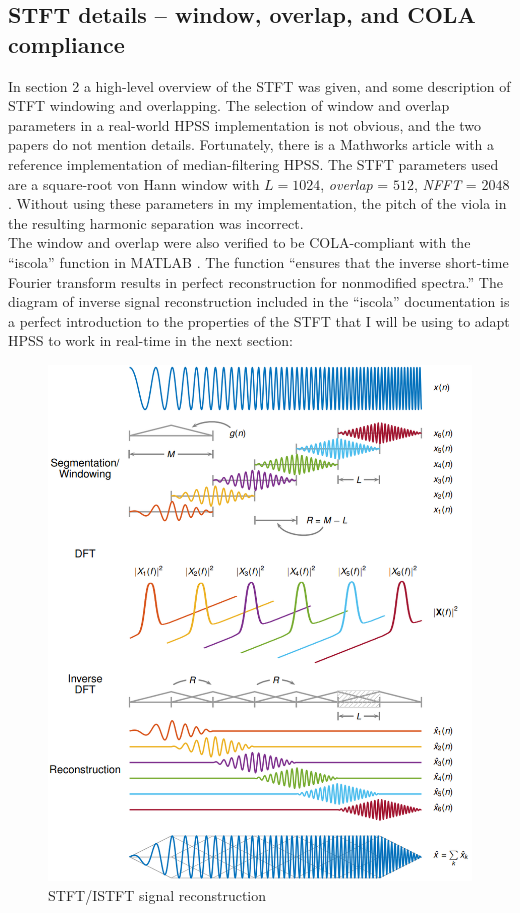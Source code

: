 \documentclass[letter,12pt]{article}
\begin{document}
\vfill
\clearpage %

\subsection{STFT details -- window, overlap, and COLA compliance}

In section 2 a high-level overview of the STFT was given, and some description of STFT windowing and overlapping. The selection of window and overlap parameters in a real-world HPSS implementation is not obvious, and the two papers do not mention details. Fortunately, there is a Mathworks article \cite{god} with a reference implementation of median-filtering HPSS. The STFT parameters used are a square-root von Hann window with $L = 1024$, \textit{overlap} = $512$, \textit{NFFT} = $2048$. Without using these parameters in my implementation, the pitch of the viola in the resulting harmonic separation was incorrect.\\

The window and overlap were also verified to be COLA-compliant with the ``iscola'' function in MATLAB \cite{cola}. The function ``ensures that the inverse short-time Fourier transform results in perfect reconstruction for nonmodified spectra.'' The diagram of inverse signal reconstruction included in the ``iscola'' documentation is a perfect introduction to the properties of the STFT that I will be using to adapt HPSS to work in real-time in the next section:

\begin{figure}[ht]
	\centering
	\includegraphics[width=12cm]{../images/iscola0111.png}
	\caption{STFT/ISTFT signal reconstruction}
	\label{fig:cola}
\end{figure}
\end{document}
